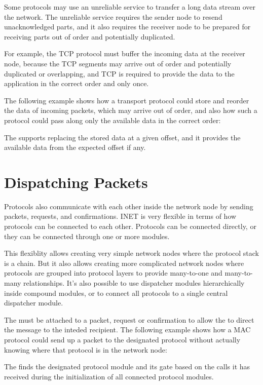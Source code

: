 Some protocols may use an unreliable service to transfer a long data stream over
the network. The unreliable service requires the sender node to resend
unacknowledged parts, and it also requires the receiver node to be prepared for
receiving parts out of order and potentially duplicated.

For example, the TCP protocol must buffer the incoming data at the receiver
node, because the TCP segments may arrive out of order and potentially
duplicated or overlapping, and TCP is required to provide the data to the
application in the correct order and only once.

The following example shows how a transport protocol could store and reorder the
data of incoming packets, which may arrive out of order, and also how such a
protocol could pass along only the available data in the correct order:


The  supports replacing the stored data at a given
offset, and it provides the available data from the expected offset if any.

\section{Dispatching Packets}
\label{sec:packets:dispatching-packets}

Protocols also communicate with each other inside the network node by sending
packets, requests, and confirmations. INET is very flexible in terms of how
protocols can be connected to each other. Protocols can be connected directly,
or they can be connected through one or more 
modules.

This flexiblity allows creating very simple network nodes where the protocol
stack is a chain. But it also allows creating more complicated network nodes
where protocols are grouped into protocol layers to provide many-to-one and
many-to-many relationships. It's also possible to use dispatcher modules
hierarchically inside compound modules, or to connect all protocols to a single
central dispatcher module.

The  must be attached to a packet, request or
confirmation to allow the  to direct the message to
the inteded recipient. The following example shows how a MAC protocol could send
up a packet to the designated protocol without actually knowing where that
protocol is in the network node:


The  finds the designated protocol module and its
gate based on the  calls it has received during the
initialization of all connected protocol modules.

